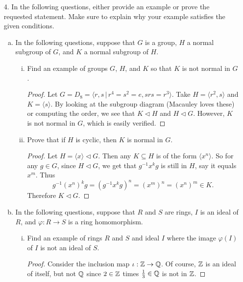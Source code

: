 \begin{itemize}
\begin{enumerate}[(a)]
\end{enumerate}





\item[4.] In the following questions, either provide an example or prove the requested statement. Make sure to explain why your example satisfies the given conditions. 
\begin{enumerate}[(a)]
\item In the following questions, suppose that $G$ is a group, $H$ a normal subgroup of $G$, and $K$ a normal subgroup of $H$.
    \begin{enumerate}[(i)]
        \item Find an example of groups $G$, $H$, and $K$ so that $K$ is not normal in $G$.
        \begin{proof}
        Let $G=D_8 = \langle r, s \, | \, r^4 = s^2 = e, srs = r^3 \rangle$. Take $H = \langle r^2, s \rangle$ and $K = \langle s \rangle$. By looking at the subgroup diagram (Macauley loves these) or computing the order, we see that $K \vartriangleleft H$ and $H \vartriangleleft G$. However, $K$ is not normal in $G$, which is easily verified.
        \end{proof}
        
        \item Prove that if $H$ is cyclic, then $K$ is normal in $G$.
        \begin{proof}
        Let $H = \langle x \rangle \vartriangleleft G$. Then any $K \subseteq H$ is of the form $\langle x^n \rangle$. So for any $g \in G$, since $H \vartriangleleft G$, we get that $g^{-1} x^k g$ is still in $H$, say it equals $x^m$. Thus
        \[g^{-1} (x^n)^k g = (g^{-1} x^k g)^n = (x^m)^n = (x^n)^m \in K.\]
        Therefore $K \vartriangleleft G$.
        \end{proof}
    \end{enumerate}


\item In the following questions, suppose that $R$ and $S$ are rings, $I$ is an ideal of $R$, and $\varphi : R \rightarrow S$ is a ring homomorphism. 
    \begin{enumerate}[(i)]
        \item Find an example of rings $R$ and $S$ and ideal $I$ where the image $\varphi(I)$ of $I$ is not an ideal of $S$.
        \begin{proof}
        Consider the inclusion map $\iota : \mathbb{Z} \rightarrow \mathbb{Q}$. Of course, $\mathbb{Z}$ is an ideal of itself, but not $\mathbb{Q}$ since $2 \in \mathbb{Z}$ times $\frac{1}{3} \in \mathbb{Q}$ is not in $\mathbb{Z}$.


\end{proof}
\end{enumerate}
\end{enumerate}
\end{itemize}
